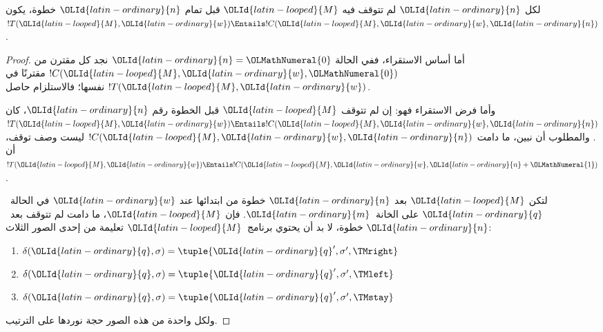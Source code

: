 \documentclass[../../../include/open-logic-section]{subfiles}
\begin{document}
\begin{lem}
لكل ${\OLId{latin-ordinary}{n}}$ لم تتوقف فيه ${\OLId{latin-looped}{M}}$ قبل تمام ${\OLId{latin-ordinary}{n}}$ خطوة، يكون
$!T({\OLId{latin-looped}{M}},{\OLId{latin-ordinary}{w}})\Entails !C({\OLId{latin-looped}{M}},{\OLId{latin-ordinary}{w}},{\OLId{latin-ordinary}{n}})$.
\end{lem}

\begin{proof}
أما أساس الاستقراء، ففي الحالة ${\OLId{latin-ordinary}{n}}={\OLMathNumeral{0}}$ نجد كل مقترن من
$!C({\OLId{latin-looped}{M}},{\OLId{latin-ordinary}{w}},{\OLMathNumeral{0}})$ مقترنًا في $!T({\OLId{latin-looped}{M}},{\OLId{latin-ordinary}{w}})$ نفسها؛ فالاستلزام حاصل.

وأما فرض الاستقراء فهو: إن لم تتوقف ${\OLId{latin-looped}{M}}$ قبل الخطوة رقم ${\OLId{latin-ordinary}{n}}$،
كان $!T({\OLId{latin-looped}{M}},{\OLId{latin-ordinary}{w}})\Entails !C({\OLId{latin-looped}{M}},{\OLId{latin-ordinary}{w}},{\OLId{latin-ordinary}{n}})$. والمطلوب أن نبين، ما دامت
$!C({\OLId{latin-looped}{M}},{\OLId{latin-ordinary}{w}},{\OLId{latin-ordinary}{n}})$ ليست وصف توقف، أن $!T({\OLId{latin-looped}{M}},{\OLId{latin-ordinary}{w}})\Entails !C({\OLId{latin-looped}{M}},{\OLId{latin-ordinary}{w}},{\OLId{latin-ordinary}{n}}+{\OLMathNumeral{1}})$.

لتكن ${\OLId{latin-looped}{M}}$ بعد ${\OLId{latin-ordinary}{n}}$ خطوة من ابتدائها عند ${\OLId{latin-ordinary}{w}}$ في الحالة~${\OLId{latin-ordinary}{q}}$
على الخانة~${\OLId{latin-ordinary}{m}}$. فإن ${\OLId{latin-looped}{M}}$، ما دامت لم تتوقف بعد~${\OLId{latin-ordinary}{n}}$ خطوة،
لا بد أن يحتوي برنامج~${\OLId{latin-looped}{M}}$ تعليمة من إحدى الصور الثلاث:

\begin{enumerate}
\item {} $\delta({\OLId{latin-ordinary}{q}}, \sigma) = \tuple{{\OLId{latin-ordinary}{q}}', \sigma', \TMright}$

\item {} $\delta({\OLId{latin-ordinary}{q}}, \sigma) = \tuple{{\OLId{latin-ordinary}{q}}', \sigma', \TMleft}$

\item {} $\delta({\OLId{latin-ordinary}{q}}, \sigma) = \tuple{{\OLId{latin-ordinary}{q}}', \sigma', \TMstay}$
\end{enumerate}

ولكل واحدة من هذه الصور حجة نوردها على الترتيب.


\end{proof}
\end{document}
